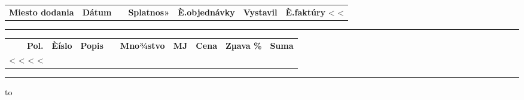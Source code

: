 \documentclass[twoside]{article}
\begin{document}
{\begin{tabularx}{\textwidth}
\hspace{-3mm}
\begin{tabularx}{\textwidth}{>{\hsize=2.1cm\centering}X@{\ }
                             >{\hsize=2.8cm\centering}X@{\ }
                             >{\hsize=2.8cm\centering}X@{\ }
                             >{\hsize=2.8cm\centering}X@{\ }
                             >{\hsize=3.4cm\centering}X@{\ }
                             >{\hsize=2.5cm\centering}X@{\ }
                             >{\hsize=2.0cm\raggedleft}X@{}}
  \textbf{Miesto dodania} & \textbf{Dátum} & \textbf{ } &
  \textbf{Splatnos»} & \textbf{È.objednávky} & \textbf{Vystavil} & \textbf{È.faktúry} 
  \cr
  <%
  <%
\end{tabularx}


\vspace{5mm}

\rule{\textwidth}{1.5pt}

\vspace{3mm}

\hspace{-3mm}
{\scriptsize

\begin{tabularx}{\textwidth}{@{}rlXlrlrrr@{}}
  \textbf{Pol.} & \textbf{Èíslo} & \textbf{Popis} & & \textbf{Mno¾stvo} &
    \textbf{MJ} & \textbf{Cena} & \textbf{Zµava \%} & \textbf{Suma} \\ [0.5em]
<%
  <%
  <%
<%
\end{tabularx}


\rule{\textwidth}{1.5pt}

\hbox to}
\end{tabularx}}
\end{document}
